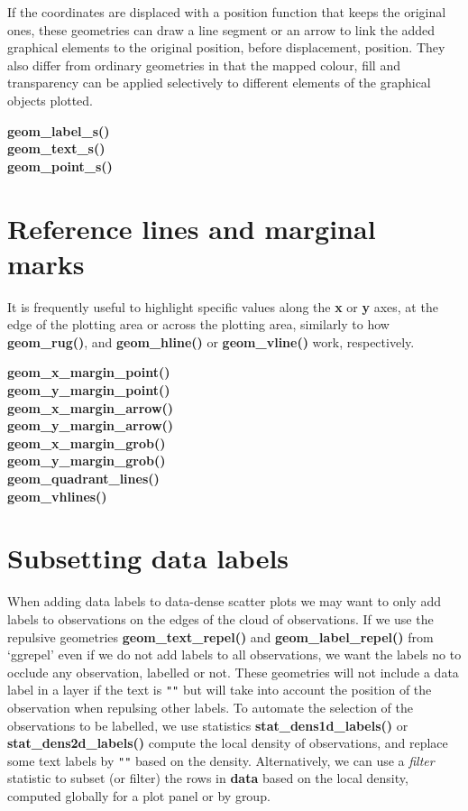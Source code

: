 \documentclass[DIV=21,a3,landscape,9pt]{scrartcl}\usepackage[]{graphicx}\usepackage[]{xcolor}
\begin{document}
\begin{multicols}{3}
If the coordinates are displaced with a position function that keeps the original ones, these geometries can draw a line segment or an arrow to link the added graphical elements to the original position, before displacement, position. They also differ from ordinary geometries in that the mapped colour, fill and transparency can be applied selectively to different elements of the graphical objects plotted.\vspace{1ex}

\noindent
\textbf{geom\_label\_s()}\\
\textbf{geom\_text\_s()}\\
\textbf{geom\_point\_s()}

\section*{Reference lines and marginal marks}

It is frequently useful to highlight specific values along the \textbf{x} or \textbf{y} axes, at the edge of the plotting area or across the plotting area, similarly to how \textbf{geom\_rug()}, and \textbf{geom\_hline()} or \textbf{geom\_vline()} work, respectively.\vspace{1ex}

\noindent
\textbf{geom\_x\_margin\_point()}\\
\textbf{geom\_y\_margin\_point()}\\
\textbf{geom\_x\_margin\_arrow()}\\
\textbf{geom\_y\_margin\_arrow()}\\
\textbf{geom\_x\_margin\_grob()}\\
\textbf{geom\_y\_margin\_grob()}\\
\textbf{geom\_quadrant\_lines()}\\
\textbf{geom\_vhlines()}

\section*{Subsetting data labels}

When adding data labels to data-dense scatter plots we may want to only add labels to observations on the edges of the cloud of observations. If we use the repulsive geometries \textbf{geom\_text\_repel()} and \textbf{geom\_label\_repel()} from `ggrepel' even if we do not add labels to all observations, we want the labels no to occlude any observation, labelled or not. These geometries will not include a data label in a layer if the text is \texttt{""} but will take into account the position of the observation when repulsing other labels. To automate the selection of the observations to be labelled, we use statistics \textbf{stat\_dens1d\_labels()} or \textbf{stat\_dens2d\_labels()} compute the local density of observations, and replace some text labels by \texttt{""} based on the density. Alternatively, we can use a \emph{filter} statistic to subset (or filter) the rows in \textbf{data} based on the local density, computed globally for a plot panel or by group.\vspace{1ex}


\end{multicols}
\end{document}
